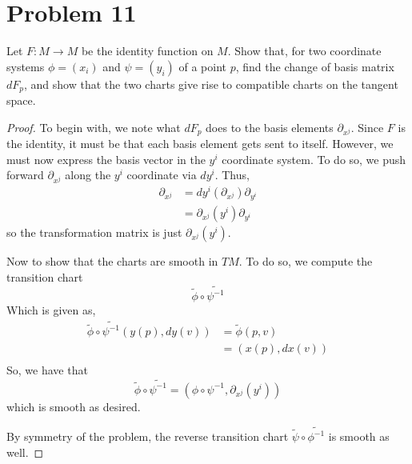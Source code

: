 \documentclass[fontsize=11pt]{scrartcl} %
\numberwithin{equation}{section} %
\numberwithin{figure}{section} %
\numberwithin{table}{section} %
\begin{document}
\section*{Problem 11}
Let $F:M\to M$ be the identity function on $M$. Show that, for two coordinate systems
$\phi = (x_i)$ and $\psi = (y_i)$ of a point $p$, find the change of basis matrix $dF_p$, and
show that the two charts give rise to compatible charts on the tangent space.
\\
\begin{proof}
To begin with, we note what $dF_p$ does to the basis elements $\partial_{x^j}$.
Since $F$ is the identity, it must be that each basis element gets sent to itself.
However, we must now express the basis vector in the $y^i$ coordinate system. To do
so, we push forward $\partial_{x^j}$ along the $y^i$ coordinate via $dy^i$.
Thus,
\[
\begin{aligned}
\partial_{x^j} &= dy^i(\partial_{x^j})\partial_{y^i}\\
                &= \partial_{x^j}(y^i)\partial_{y^i}
\end{aligned}
\]
so the transformation matrix is just $\partial_{x^j}(y^i)$.

Now to show that the charts are smooth in $TM$. To do so, we compute the transition
chart
\[
\tilde{\phi}\circ\tilde{\psi^{-1}}
\]
Which is given as,
\[
\begin{aligned}
\tilde{\phi}\circ\tilde{\psi^{-1}}(y(p),dy(v))  &= \tilde{\phi}(p,v)\\
                                                &= (x(p), dx(v))\\
\end{aligned}
\]
So, we have that
\[
\tilde{\phi}\circ\tilde{\psi^{-1}} = (\phi\circ\psi^{-1}, \partial_{x^j}(y^i))
\]
which is smooth as desired.

By symmetry of the problem, the reverse transition chart $\tilde{\psi}\circ\tilde{\phi^{-1}}$
is smooth as well.
\end{proof}
\end{document}
